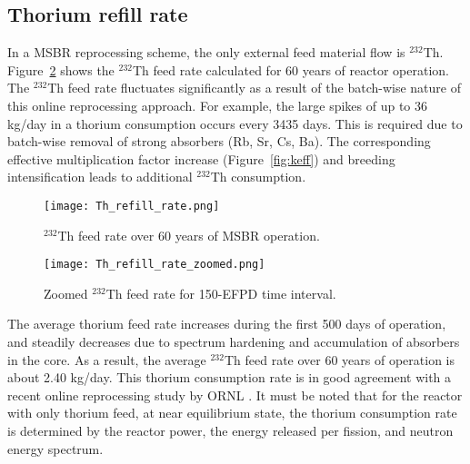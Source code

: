 \subsection{Thorium refill rate}
In a \gls{MSBR} reprocessing scheme, the only external feed material flow  is 
$^{232}$Th. Figure~\ref{fig:th_refill} shows the $^{232}$Th feed rate 
calculated for 60 years of reactor operation. The $^{232}$Th feed rate 
fluctuates significantly as a result of the batch-wise nature of this online 
reprocessing approach. For example, the large spikes of up to 36 kg/day in a 
thorium consumption occurs every 3435 days. This is required due to batch-wise 
removal of strong absorbers (Rb, Sr, Cs, Ba). The corresponding effective 
multiplication factor increase (Figure~\ref{fig:keff}) and breeding 
intensification leads to additional $^{232}$Th consumption.  
\begin{figure}[ht!] %
  \texttt{[image: Th\_refill\_rate.png]} \caption{$^{232}$Th 
  feed rate over 60 years of \gls{MSBR} operation.}
  \label{fig:th_refill}
\end{figure}
\begin{figure}[ht!] %
  \texttt{[image: Th\_refill\_rate\_zoomed.png]} \caption{Zoomed $^{232}$Th 
  feed rate for 150-EFPD time interval.}
  \label{fig:th_refill}
\end{figure}

The average thorium feed rate increases during the first 500 days of operation, 
and steadily decreases due to spectrum hardening and accumulation of 
absorbers in the core. As a result, the average $^{232}$Th feed rate over 60 
years of operation is about 2.40 kg/day. This thorium consumption rate is in 
good agreement with a recent online reprocessing study by \gls{ORNL} 
\cite{betzler_molten_2017}. It must be noted that for the reactor with only 
thorium feed, at near equilibrium state, the thorium consumption rate is 
determined by the reactor power, the energy released per fission, and 
neutron energy spectrum.

